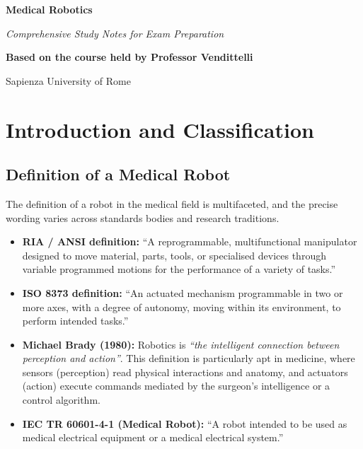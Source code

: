 \documentclass[11pt,a4paper,twoside]{report}
\begin{document}
\begin{titlepage}
    \centering
    \vspace*{2cm}
    {\fontsize{38}{45}\selectfont \bfseries Medical Robotics\par}
    \vspace{1.5cm}
    {\Large \itshape Comprehensive Study Notes for Exam Preparation\par}
    \vspace{1.5cm}
    {\large \textbf{Based on the course held by Professor Vendittelli}\par}
    \vspace{0.5cm}
    {\large Sapienza University of Rome\par}
    \vspace{3cm}
    \vfill
\end{titlepage}

\tableofcontents
\newpage

\chapter{Introduction and Classification}

\section{Definition of a Medical Robot}
The definition of a robot in the medical field is multifaceted, and the precise wording varies across standards bodies and research traditions.

\begin{itemize}
    \item \textbf{RIA / ANSI definition:} ``A reprogrammable, multifunctional manipulator designed to move material, parts, tools, or specialised devices through variable programmed motions for the performance of a variety of tasks.''
    \item \textbf{ISO 8373 definition:} ``An actuated mechanism programmable in two or more axes, with a degree of autonomy, moving within its environment, to perform intended tasks.''
    \item \textbf{Michael Brady (1980):} Robotics is \textit{``the intelligent connection between perception and action''}. This definition is particularly apt in medicine, where sensors (perception) read physical interactions and anatomy, and actuators (action) execute commands mediated by the surgeon's intelligence or a control algorithm.
    \item \textbf{IEC TR 60601-4-1 (Medical Robot):} ``A robot intended to be used as medical electrical equipment or a medical electrical system.''
\end{itemize}
\end{document}
